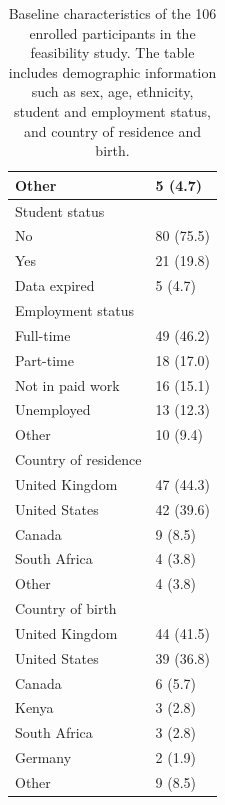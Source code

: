\begin{table}[htbp]
\begin{tabular}{l l}
		\quad Other             & 5 (4.7)                                  \\
		\hline
		Student status          &                                          \\
		\quad No                & 80 (75.5)                                \\
		\quad Yes               & 21 (19.8)                                \\
		\quad Data expired      & 5 (4.7)                                  \\
		\hline
		Employment status       &                                          \\
		\quad Full-time         & 49 (46.2)                                \\
		\quad Part-time         & 18 (17.0)                                \\
		\quad Not in paid work  & 16 (15.1)                                \\
		\quad Unemployed        & 13 (12.3)                                \\
		\quad Other             & 10 (9.4)                                 \\
		\hline
		Country of residence    &                                          \\
		\quad United Kingdom    & 47 (44.3)                                \\
		\quad United States     & 42 (39.6)                                \\
		\quad Canada            & 9 (8.5)                                  \\
		\quad South Africa      & 4 (3.8)                                  \\
		\quad Other             & 4 (3.8)                                  \\
		\hline
		Country of birth        &                                          \\
		\quad United Kingdom    & 44 (41.5)                                \\
		\quad United States     & 39 (36.8)                                \\
		\quad Canada            & 6 (5.7)                                  \\
		\quad Kenya             & 3 (2.8)                                  \\
		\quad South Africa      & 3 (2.8)                                  \\
		\quad Germany           & 2 (1.9)                                  \\
		\quad Other             & 9 (8.5)                                  \\
		\hline
	\end{tabular}
	\caption[Baseline Characteristics of Enrolled Participants]{Baseline characteristics of the 106 enrolled participants in the feasibility study. The table includes demographic information such as sex, age, ethnicity, student and employment status, and country of residence and birth.}
	\label{tab:participant-characteristics}
\end{table}

